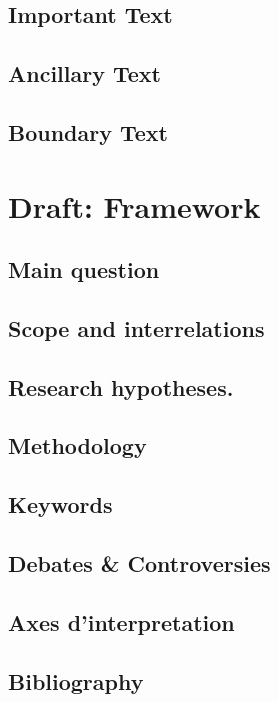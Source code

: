 \documentclass[draft=false, paper=A4,portrait,twoside=true,twocolumn=false,headinclude=false,footinclude=false,fontsize=11,BCOR=15mm,DIV=calc,pagesize=auto,titlepage=firstiscover,mpinclude=true,headings=big,headings=twolinechapter,open=right,chapterprefix=false,headsepline=false,parskip=full]{scrbook}
\begin{document}
\section{Important Text}
\label{sec:org7ff9ed3}
\lipsum
\section{Ancillary Text}
\label{sec:org844e8e6}
\lipsum
\section{Boundary Text}
\label{sec:org2e31d00}
\lipsum
\chapter{Draft: Framework}
\label{sec:org04c5b38}
\section{Main question}
\label{sec:org915ac53}
\lipsum
\section{Scope and interrelations}
\label{sec:orgde53074}
\lipsum
\section{Research hypotheses.}
\label{sec:orga52351c}
\lipsum
\section{Methodology}
\label{sec:orga38df6e}
\lipsum
\section{Keywords}
\label{sec:org89b21a8}
\lipsum
\section{Debates \& Controversies}
\label{sec:org6eef574}
\lipsum
\section{Axes d'interpretation}
\label{sec:orgcb71fed}
\lipsum
\section{Bibliography}
\label{sec:org3e8b9c3}
\end{document}
